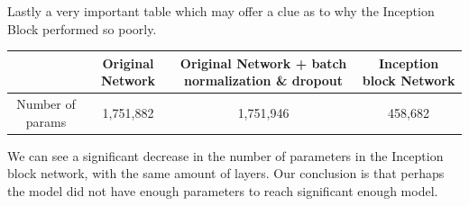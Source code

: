\documentclass{article}
\theoremstyle{remark}
\begin{document}
Lastly a very important table which may offer a clue as to why the Inception Block performed so poorly.\\

\begin{center}
    \begin{tabular}{||c c c c||} 
        \hline
        \ & Original Network & Original Network + batch normalization \& dropout & Inception block Network\\ [0.5ex] 
        \hline\hline
        Number of params & 1,751,882 & 1,751,946 & 458,682 \\
        \hline
    \end{tabular}
\end{center}

We can see a significant decrease in the number of parameters in the Inception block network, with the same amount of layers. Our conclusion is that perhaps the model did not have enough 
parameters to reach significant enough model.

\pagebreak
\end{document}
